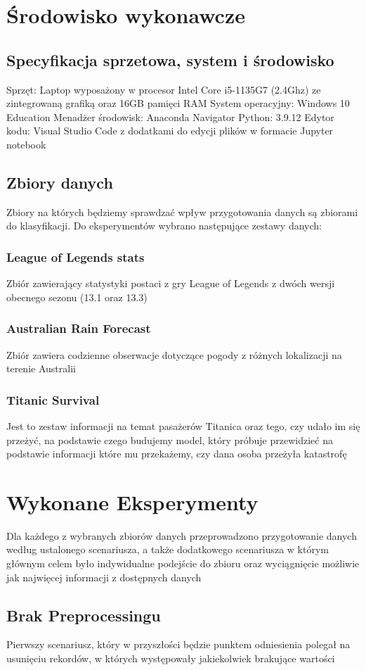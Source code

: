 \documentclass{article}
\begin{document}
\section{Środowisko wykonawcze}
\subsection{Specyfikacja sprzetowa, system i środowisko}
Sprzęt: Laptop wyposażony w procesor Intel Core i5-1135G7 (2.4Ghz) ze zintegrowaną grafiką oraz 16GB pamięci RAM
System operacyjny: Windows 10 Education
Menadżer środowisk: Anaconda Navigator
Python: 3.9.12
Edytor kodu: Visual Studio Code z dodatkami do edycji plików w formacie Jupyter notebook
\subsection{Zbiory danych}
Zbiory na których będziemy sprawdzać wpływ przygotowania danych są zbiorami do klasyfikacji. Do eksperymentów wybrano następujące zestawy danych:
\subsubsection{League of Legends stats}
Zbiór zawierający statystyki postaci z gry League of Legends z dwóch wersji obecnego sezonu (13.1 oraz 13.3)
\subsubsection{Australian Rain Forecast}
Zbiór zawiera codzienne obserwacje dotyczące pogody z różnych lokalizacji na terenie Australii
\subsubsection{Titanic Survival}
Jest to zestaw informacji na temat pasażerów Titanica oraz tego, czy udało im się przeżyć, na podstawie czego budujemy model, który próbuje przewidzieć na podstawie informacji które mu przekażemy, czy dana osoba przeżyła katastrofę

\section{Wykonane Eksperymenty}
Dla każdego z wybranych zbiorów danych przeprowadzono 
przygotowanie danych według ustalonego scenariusza, 
a także dodatkowego scenariusza w którym głównym celem było 
indywidualne podejście do zbioru oraz wyciągnięcie możliwie 
jak najwięcej informacji z dostępnych danych
\subsection{Brak Preprocessingu}
Pierwszy scenariusz, który w przyszłości 
będzie punktem odniesienia polegał na usunięciu rekordów, 
w których występowały jakiekolwiek brakujące wartości
\end{document}
